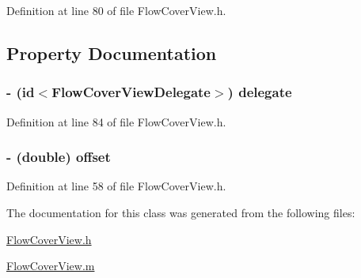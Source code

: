 Definition at line 80 of file FlowCoverView.h.



\subsection{Property Documentation}
\hypertarget{interface_flow_cover_view_a1d8f500666d885b6348c31483be52c4a}{
\subsubsection[{delegate}]{\setlength{\rightskip}{0pt plus 5cm}-\/ (id$<${\bf FlowCoverViewDelegate}$>$) {\bf delegate}}}
\label{interface_flow_cover_view_a1d8f500666d885b6348c31483be52c4a}


Definition at line 84 of file FlowCoverView.h.

\hypertarget{interface_flow_cover_view_a129303e4bd38a8cdba722b6238ed56e9}{
\subsubsection[{offset}]{\setlength{\rightskip}{0pt plus 5cm}-\/ (double) offset}}
\label{interface_flow_cover_view_a129303e4bd38a8cdba722b6238ed56e9}


Definition at line 58 of file FlowCoverView.h.



The documentation for this class was generated from the following files:\begin{DoxyCompactItemize}
\item 
\hyperlink{_flow_cover_view_8h}{FlowCoverView.h}\item 
\hyperlink{_flow_cover_view_8m}{FlowCoverView.m}\end{DoxyCompactItemize}
